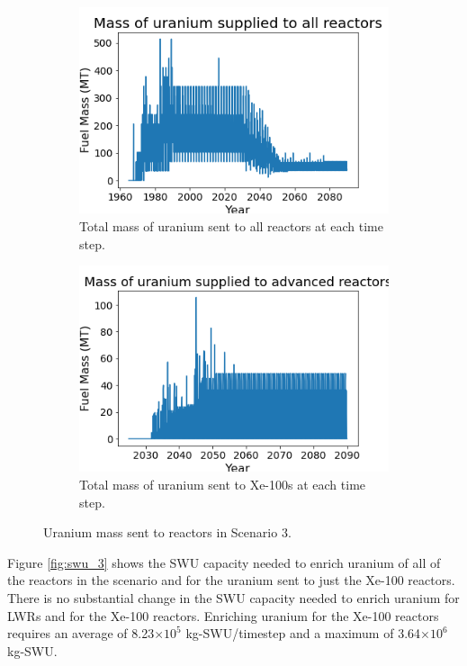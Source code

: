 \begin{figure}
    \centering
    \begin{subfigure}{0.4\textwidth}
        \centering
        \includegraphics[scale=0.3]{figures/fuelsupply_scenarios_3.png}
        \caption{Total mass of uranium sent to all reactors at each time step.}
        \label{fig:totalfuel_3}
    \end{subfigure}
    \begin{subfigure}{0.4\textwidth}
        \centering
        \includegraphics[scale=0.3]{figures/advancedRX_fuelsupply_scenarios_3.png}
        \caption{Total mass of uranium sent to Xe-100s at each time step.}
        \label{fig:haleu_3}
    \end{subfigure}
    \caption{Uranium mass sent to reactors in Scenario 3.}
    \label{fig:fuel_3}
\end{figure}

Figure \ref{fig:swu_3} shows the \gls{SWU} capacity needed to enrich 
uranium of all of the reactors in the scenario and for the uranium sent 
to just the Xe-100 reactors. There is no substantial change in the 
\gls{SWU} capacity needed to enrich uranium for \glspl{LWR} and for the Xe-100 
reactors. Enriching uranium for the Xe-100 reactors requires an average of 
8.23$\times 10^5$ kg-\gls{SWU}/timestep and a maximum of 3.64$\times 10^6$
kg-\gls{SWU}. 

